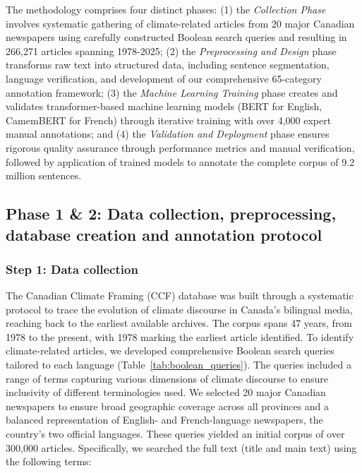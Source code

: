 \documentclass[12pt]{article}
\begin{document}
The methodology comprises four distinct phases: (1) the \emph{Collection Phase} involves systematic gathering of climate-related articles from 20 major Canadian newspapers using carefully constructed Boolean search queries and resulting in 266,271 articles spanning 1978-2025; (2) the \emph{Preprocessing and Design} phase transforms raw text into structured data, including sentence segmentation, language verification, and development of our comprehensive 65-category annotation framework; (3) the \emph{Machine Learning Training} phase creates and validates transformer-based machine learning models (BERT for English, CamemBERT for French) through iterative training with over 4,000 expert manual annotations; and (4) the \emph{Validation and Deployment} phase ensures rigorous quality assurance through performance metrics and manual verification, followed by application of trained models to annotate the complete corpus of 9.2 million sentences.

\subsection{Phase 1 \& 2: Data collection, preprocessing, database creation and annotation protocol}

\subsubsection{Step 1: Data collection}

The Canadian Climate Framing (CCF) database was built through a systematic protocol to trace the evolution of climate discourse in Canada’s bilingual media, reaching back to the earliest available archives. The corpus spans 47 years, from 1978 to the present, with 1978 marking the earliest article identified. To identify climate-related articles, we developed comprehensive Boolean search queries tailored to each language (Table~\ref{tab:boolean_queries}). The queries included a range of terms capturing various dimensions of climate discourse to ensure inclusivity of different terminologies used. We selected 20 major Canadian newspapers to ensure broad geographic coverage across all provinces and a balanced representation of English- and French-language newspapers, the country’s two official languages. These queries yielded an initial corpus of over 300,000 articles. Specifically, we searched the full text (title and main text) using the following terms:
\end{document}
